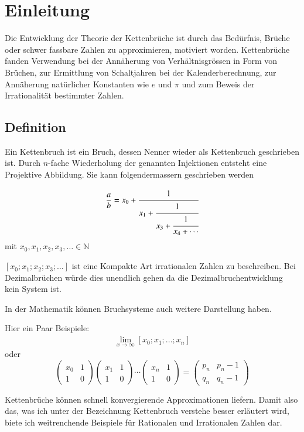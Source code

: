 %
%
%
\section{Einleitung\label{kettenbruch:section:einleitung}}
Die Entwicklung der Theorie der Kettenbrüche ist durch das Bedürfnis,
Brüche oder schwer fassbare Zahlen zu approximieren, motiviert
worden. Kettenbrüche fanden Verwendung bei der Annäherung von
Verhältnisgrössen in Form von Brüchen, zur Ermittlung von Schaltjahren
bei der Kalenderberechnung, zur Annäherung natürlicher Konstanten
wie $e$ und $\pi$ und zum Beweis der Irrationalität bestimmter
Zahlen.

\subsection{Definition\label{kettenbruch:section:1s}}
Ein Kettenbruch ist ein Bruch, dessen Nenner wieder als Kettenbruch
geschrieben ist.
Durch $n$-fache Wiederholung der genannten Injektionen entsteht
eine Projektive Abbildung.
Sie kann folgendermassern geschrieben werden

\begin{align*}
\frac{a}{b}=x_0+\cfrac{1}{x_1+\cfrac{1}{x_3+\cfrac{1}{x_4+\cdots}}}
\end{align*}
mit $x_0,x_1,x_2,x_3, \dots \in \mathbb{N}$

$[x_0;x_1;x_2;x_3;\dots]$ ist eine Kompakte Art irrationalen Zahlen
zu beschreiben. Bei Dezimalbrüchen würde dies unendlich gehen da
die Dezimalbruchentwicklung kein System ist.

In der Mathematik können Bruchsysteme auch weitere Darstellung haben. 

Hier ein Paar Beispiele:
\begin{align*}
\lim_{x\to\infty} [x_0;x_1;...;x_n]
\end{align*}  
oder
\begin{equation*}
	\begin{pmatrix}
		x_0&	1\\
		1  &	0
	\end{pmatrix}
	\begin{pmatrix}
		x_1&	1\\
		1  &	0
	\end{pmatrix}
	\cdots
	\begin{pmatrix}
		x_n&	1\\
		1  &	0
	\end{pmatrix}
	=\begin{pmatrix}
		p_n&	p_n-1\\
		q_n&	q_n-1
	\end{pmatrix}
\end{equation*}

Kettenbrüche können schnell konvergierende Approximationen liefern.
Damit also das, was ich unter der Bezeichnung Kettenbruch verstehe
besser erläutert wird, biete ich weitrenchende Beispiele für
Rationalen und Irrationalen Zahlen dar.


